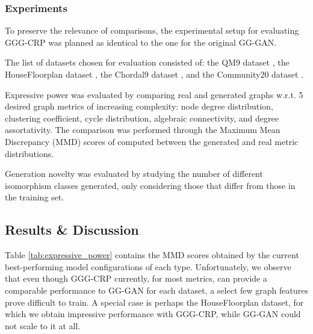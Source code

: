 \subsubsection{Experiments}

To preserve the relevance of comparisons, the experimental setup for evaluating GGG-CRP was planned as identical to the one for the original GG-GAN.

The list of datasets chosen for evaluation consisted of: the QM9 dataset \cite{de_cao_molgan_2018}, the HouseFloorplan dataset \cite{nauata_house-gan_2020}, the Chordal9 dataset \cite{mckay_chordal_2020}, and the Community20 dataset \cite{niu_permutation_2020}.

Expressive power was evaluated by comparing real and generated graphs w.r.t. 5 desired graph metrics of increasing complexity: node degree distribution, clustering coefficient, cycle distribution, algebraic connectivity, and degree assortativity. The comparison was performed through the Maximum Mean Discrepancy (MMD) scores of \cite{you_graphrnn_2018} computed between the generated and real metric distributions.

Generation novelty was evaluated by studying the number of different isomorphism classes generated, only considering those that differ from those in the training set.

\subsection{Results \& Discussion}
\label{sec:results_gggcrp}

Table \ref{tab:expressive_power} contains the MMD scores obtained by the current best-performing model configurations of each type. Unfortunately, we observe that even though GGG-CRP currently, for most metrics, can provide a comparable performance to GG-GAN for each dataset, a select few graph features prove difficult to train. A special case is perhaps the HouseFloorplan dataset, for which we obtain impressive performance with GGG-CRP, while GG-GAN could not scale to it at all.

